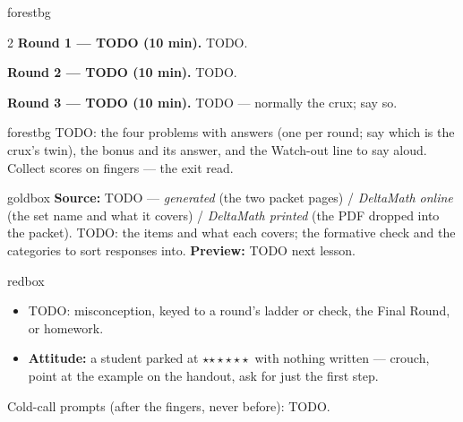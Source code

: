 \documentclass[10pt]{article}
\newcommand{\rung}[1]{{\color{goldacc}\ifcase#1\or$\star$\or$\star\star$\or$\star\star\star$\fi}}
\begin{document}
\begin{skillbox}{forestbg}
\begin{multicols}{2}
\textbf{Round 1 --- TODO (10 min).} TODO.

\textbf{Round 2 --- TODO (10 min).} TODO.

\columnbreak
\textbf{Round 3 --- TODO (10 min).} TODO --- normally the crux; say so.
\end{multicols}
\end{skillbox}

\boxguard
\begin{skillbox}{forestbg}
TODO: the four problems with answers (one per round; say which is the crux's twin), the bonus
and its answer, and the Watch-out line to say aloud. Collect scores on fingers --- the exit read.
\end{skillbox}

\boxguard
\begin{skillbox}{goldbox}
\textbf{Source:} TODO --- \emph{generated} (the two packet pages) / \emph{DeltaMath online}
(the set name and what it covers) / \emph{DeltaMath printed} (the PDF dropped into the packet).
TODO: the items and what each covers; the formative check and the categories to sort responses
into. \textbf{Preview:} TODO next lesson.
\end{skillbox}

\boxguard
\begin{skillbox}{redbox}
\begin{itemize}[leftmargin=1.2em, nosep]
  \item TODO: misconception, keyed to a round's ladder or check, the Final Round, or homework.
  \item \textbf{Attitude:} a student parked at \rung1\ with nothing written --- crouch, point at
        the example on the handout, ask for just the first step.
\end{itemize}
Cold-call prompts (after the fingers, never before): TODO.
\end{skillbox}
\end{document}
